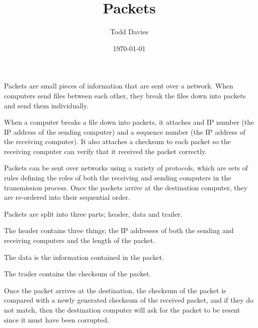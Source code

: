 \documentclass{article}
\author{Todd Davies}
\title{Packets}
\date{\today}
\begin{document}
\lhead{\today}

\maketitle

Packets are small pieces of information that are sent over a network. When
computers send files between each other, they break the files down into packets
and send them individually.

When a computer breaks a file down into packets, it attaches and IP number (the
IP address of the sending computer) and a sequence number (the IP address of the
receiving computer). It also attaches a checksum to each packet so the receiving
computer can verify that it received the packet correctly.

Packets can be sent over networks using a variety of protocols, which are sets
of rules defining the roles of both the receiving and sending computers in the
transmission process. Once the packets arrive at the destination computer, they
are re-ordered into their sequential order.

Packets are split into three parts; header, data and trailer.

The header contains three things; the IP addresses of both the sending and
receiving computers and the length of the packet.

The data is the information contained in the packet.

The trailer contains the checksum of the packet.

Once the packet arrives at the destination, the checksum of the packet is
compared with a newly generated checksum of the received packet, and if they do
not match, then the destination computer will ask for the packet to be resent
since it must have been corrupted.
\end{document}
